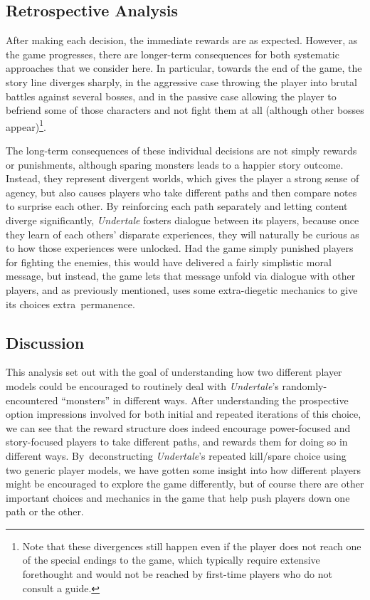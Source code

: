 \documentclass[arts,article,accept,moreauthors,pdftex,10pt,a4paper]{Definitions/mdpi}
\begin{document}
\subsection{Retrospective Analysis}

After making each decision, the immediate rewards are as expected.
%
However, as the game progresses, there are longer-term consequences for both systematic approaches that we consider here.
%
In particular, towards the end of the game, the story line diverges sharply, in the aggressive case throwing the player into brutal battles against several bosses, and in the passive case allowing the player to befriend some of those characters and not fight them at all (although other bosses appear)\footnote{Note that these divergences still happen even if the player does not reach one of the special endings to the game, which typically require extensive forethought and would not be reached by first-time players who do not consult a guide.}.


The long-term consequences of these individual decisions are not simply rewards or punishments, although sparing monsters leads to a happier story outcome.
%
Instead, they represent divergent worlds, which gives the player a strong sense of agency, but also causes players who take different paths and then compare notes to surprise each other.
%
By reinforcing each path separately and letting content diverge significantly, \emph{Undertale} fosters dialogue between its players, because once they learn of each others' disparate experiences, they will naturally be curious as to how those experiences were unlocked.
%
Had the game simply punished players for fighting the enemies, this would have delivered a fairly simplistic moral message, but instead, the game lets that message unfold via dialogue with other players, and as previously mentioned, uses some extra-diegetic mechanics to give its choices extra~permanence.


\subsection{Discussion}

This analysis set out with the goal of understanding how two different player models could be encouraged to routinely deal with \emph{Undertale}'s randomly-encountered ``monsters'' in different ways.
%
After understanding the prospective option impressions involved for both initial and repeated iterations of this choice, we can see that the reward structure does indeed encourage power-focused and story-focused players to take different paths, and rewards them for doing so in different ways.
%
By~deconstructing \emph{Undertale}'s repeated kill/spare choice using two generic player models, we have gotten some insight into how different players might be encouraged to explore the game differently, but of course there are other important choices and mechanics in the game that help push players down one path or the other.
\end{document}
